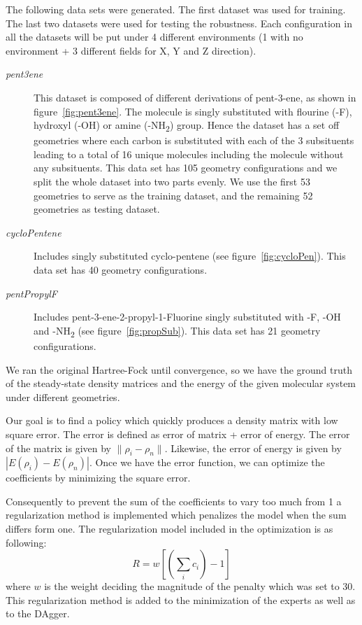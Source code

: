 \documentclass[twoside,11pt]{article}
\begin{document}
The following data sets were generated. The first dataset was used for training. The last two datasets were used for testing the robustness. Each configuration in all the datasets will be put under 4 different environments (1 with no environment + 3 different fields for X, Y and Z direction).
\begin{description}
\item[\textit{pent3ene}] This dataset is composed of different derivations of pent-3-ene, as shown in figure~\ref{fig:pent3ene}. The molecule is singly substituted with flourine (-F), hydroxyl (-OH) or amine (-NH\textsubscript{2}) group. Hence the dataset has a set off geometries where each carbon is substituted with each of the 3 subsituents leading to a total of 16 unique molecules including the molecule without any subsituents. This data set has 105 geometry configurations and we split the whole dataset into two parts evenly. We use the first 53 geometries to serve as the training dataset, and the remaining 52 geometries as testing dataset.
\item[\textit{cycloPentene}]Includes singly substituted cyclo-pentene (see figure~\ref{fig:cycloPen}). This data set has 40 geometry configurations.
\item[\textit{pentPropylF}] Includes pent-3-ene-2-propyl-1-Fluorine singly substituted with -F, -OH and -NH\textsubscript{2} (see figure~\ref{fig:propSub}). This data set has 21 geometry configurations.
\end{description}



We ran the original Hartree-Fock until convergence, so we have the ground truth of the steady-state density matrices and the energy of the given molecular system under different geometries. 

Our goal is to find a policy which quickly produces a density matrix with low square error. The error is defined as error of matrix + error of energy. The error of the matrix is given by $\|\rho_i-\rho_n\|$. Likewise, the error of energy is given by $|E(\rho_i)-E(\rho_n)|$. Once we have the error function, we can optimize the coefficients by minimizing the square error.

Consequently to prevent the sum of the coefficients to vary too much from 1 a regularization method is implemented which penalizes the model when the sum differs form one. The regularization model included in the optimization is as following:
\[
R =  w [(\sum_i c_i) - 1]
\]
where $w$ is the weight deciding the magnitude of the penalty which was set to 30. This regularization method is added to the minimization of the experts as well as to the DAgger.
\end{document}
